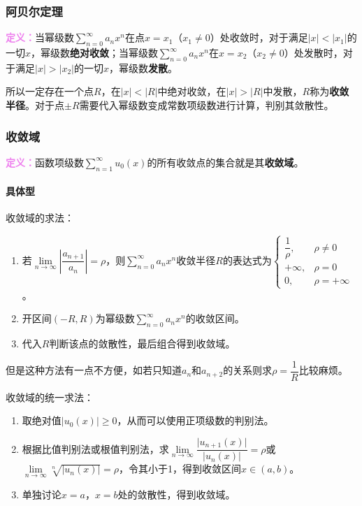 \documentclass[UTF8, 12pt]{ctexart}
\begin{document}
\subsubsection{阿贝尔定理}

\textcolor{violet}{\textbf{定义：}}当幂级数$\sum\limits_{n=0}^\infty a_nx^n$在点$x=x_1$（$x_1\neq0$）处收敛时，对于满足$\vert x\vert<\vert x_1\vert$的一切$x$，幂级数\textbf{绝对收敛}；当幂级数$\sum\limits_{n=0}^\infty a_nx^n$在$x=x_2$（$x_2\neq0$）处发散时，对于满足$\vert x\vert>\vert x_2\vert$的一切$x$，幂级数\textbf{发散}。

所以一定存在一个点$R$，在$\vert x\vert<\vert R\vert$中绝对收敛，在$\vert x\vert>\vert R\vert$中发散，$R$称为\textbf{收敛半径}。对于点$\pm R$需要代入幂级数变成常数项级数进行计算，判别其敛散性。

\subsubsection{收敛域}

\textcolor{violet}{\textbf{定义：}}函数项级数$\sum\limits_{n=1}^\infty u_0(x)$的所有收敛点的集合就是其\textbf{收敛域}。

\paragraph{具体型} \leavevmode \medskip

收敛域的求法：

\begin{enumerate}
    \item 若$\lim\limits_{n\to\infty}\left\vert\dfrac{a_{n+1}}{a_n}\right\vert=\rho$，则$\sum\limits_{n=0}^\infty a_nx^n$收敛半径$R$的表达式为$\left\{\begin{array}{ll}
        \dfrac{1}{\rho}, & \rho\neq0 \\
        +\infty, & \rho=0 \\
        0, & \rho=+\infty
    \end{array}\right.$。
    \item 开区间$(-R,R)$为幂级数$\sum\limits_{n=0}^\infty a_nx^n$的收敛区间。
    \item 代入$R$判断该点的敛散性，最后组合得到收敛域。
\end{enumerate}

但是这种方法有一点不方便，如若只知道$a_n$和$a_{n+2}$的关系则求$\rho=\dfrac{1}{R}$比较麻烦。

收敛域的统一求法：

\begin{enumerate}
    \item 取绝对值$\vert u_0(x)\vert\geqslant0$，从而可以使用正项级数的判别法。
    \item 根据比值判别法或根值判别法，求$\lim\limits_{n\to\infty}\dfrac{\vert u_{n+1}(x)\vert}{\vert u_n(x)\vert}=\rho$或$\lim\limits_{n\to\infty}\sqrt[n]{\vert u_n(x)\vert}=\rho$，令其小于1，得到收敛区间$x\in(a,b)$。
    \item 单独讨论$x=a$，$x=b$处的敛散性，得到收敛域。
\end{enumerate}
\end{document}
